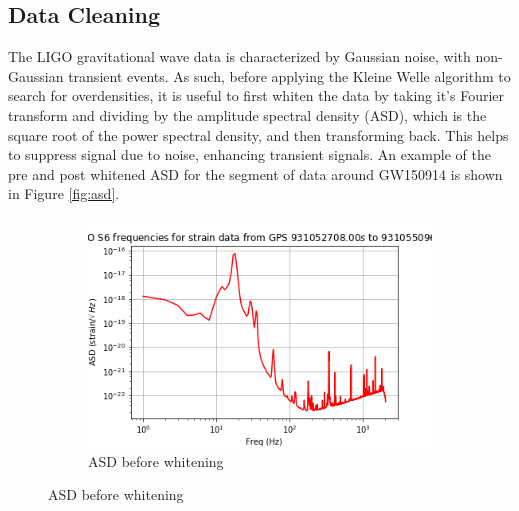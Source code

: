 \documentclass{article}
\begin{document}
\subsection{Data Cleaning}
The LIGO gravitational wave data is characterized by Gaussian noise, with non-Gaussian transient events. As such, before applying the Kleine Welle algorithm to search for overdensities, it is useful to first whiten the data by taking it's Fourier transform and dividing by the amplitude spectral density (ASD), which is the square root of the power spectral density, and then transforming back\citep{LIGOScientificCollaboration}. This helps to suppress signal due to noise, enhancing transient signals. An example of the pre and post whitened ASD for the segment of data around GW150914 is shown in Figure \ref{fig:asd}.

\begin{figure}
\begin{subfigure}{\textwidth}
\includegraphics[width=\textwidth]{noise.png}
\caption{ASD before whitening}
\label{fig:prewhite}
\end{subfigure}


\end{figure}
\end{document}
